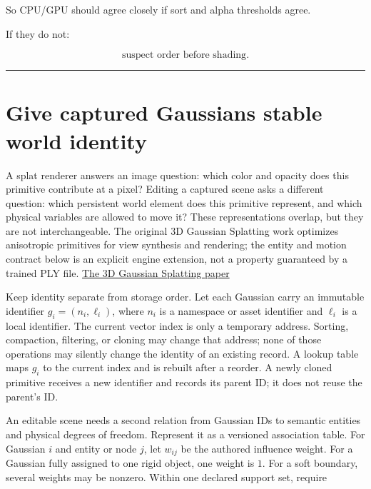 So CPU/GPU should agree closely if sort and alpha thresholds agree.

If they do not:

\[
\boxed{
\text{suspect order before shading}.
}
\]

\begin{center}\rule{0.5\linewidth}{0.5pt}\end{center}

\section{Give captured Gaussians stable world identity}\label{04-visual-computing-ii-ch039-give-captured-gaussians-stable-world-identity}

\hypertarget{04-visual-computing-ii-ch039-give-captured-gaussians-stable-world-identity}{}

A splat renderer answers an image question: which color and opacity does this primitive contribute at a pixel? Editing a captured scene asks a different question: which persistent world element does this primitive represent, and which physical variables are allowed to move it? These representations overlap, but they are not interchangeable. The original 3D Gaussian Splatting work optimizes anisotropic primitives for view synthesis and rendering; the entity and motion contract below is an explicit engine extension, not a property guaranteed by a trained PLY file. \href{https://arxiv.org/abs/2308.04079}{The 3D Gaussian Splatting paper}

Keep identity separate from storage order. Let each Gaussian carry an immutable identifier \(g_i=(n_i,\ell_i)\), where \(n_i\) is a namespace or asset identifier and \(\ell_i\) is a local identifier. The current vector index is only a temporary address. Sorting, compaction, filtering, or cloning may change that address; none of those operations may silently change the identity of an existing record. A lookup table maps \(g_i\) to the current index and is rebuilt after a reorder. A newly cloned primitive receives a new identifier and records its parent ID; it does not reuse the parent's ID.

An editable scene needs a second relation from Gaussian IDs to semantic entities and physical degrees of freedom. Represent it as a versioned association table. For Gaussian \(i\) and entity or node \(j\), let \(w_{ij}\) be the authored influence weight. For a Gaussian fully assigned to one rigid object, one weight is \(1\). For a soft boundary, several weights may be nonzero. Within one declared support set, require

